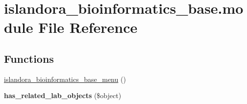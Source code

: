 \hypertarget{islandora__bioinformatics__base_8module}{\section{islandora\+\_\+bioinformatics\+\_\+base.\+module File Reference}
\label{islandora__bioinformatics__base_8module}
}
\subsection*{Functions}
\begin{DoxyCompactItemize}
\item 
\hyperlink{islandora__bioinformatics__base_8module_a34856467f23719cd8eaf851f85ccf7e8}{islandora\+\_\+bioinformatics\+\_\+base\+\_\+menu} ()
\item 
\hypertarget{islandora__bioinformatics__base_8module_a8bc2170d2deb3df2af507fb22571e0f4}{{\bfseries has\+\_\+related\+\_\+lab\+\_\+objects} (\$object)}\label{islandora__bioinformatics__base_8module_a8bc2170d2deb3df2af507fb22571e0f4}


\end{DoxyCompactItemize}
